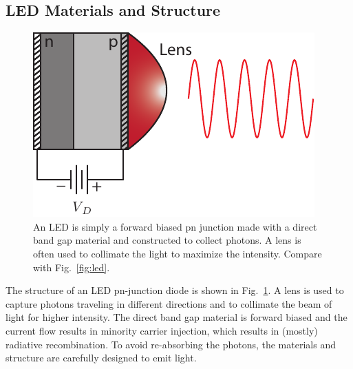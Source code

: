 \subsection{LED Materials and Structure}
\begin{figure}[tb]
\begin{center}
\includegraphics[width=.35\columnwidth]{led_struct}
\end{center}
\caption{An LED is simply a forward biased pn junction made with a direct band gap material and constructed to collect photons.  A lens is often used to collimate the light to maximize the intensity.  Compare with Fig.~\ref{fig:led}.}
\label{fig:led_struct}
\end{figure}

The structure of an LED pn-junction diode is shown in Fig.~\ref{fig:led_struct}.  A lens is used to capture photons traveling in different directions and to collimate the beam of light for higher intensity.    The direct band gap material is forward biased and the current flow results in minority carrier injection, which results in (mostly) radiative recombination.  To avoid re-absorbing the photons, the materials and structure are carefully designed to emit light. 


